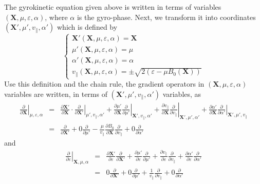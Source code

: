 \documentclass{article}
\begin{document}
The gyrokinetic equation given above is written in terms of variables
$(\mathbf{X}, \mu, \varepsilon, \alpha)$, where $\alpha$ is the gyro-phase.
Next, we transform it into coordinates $(\mathbf{X}', \mu', v_{\parallel},
\alpha')$ which is defined by
\begin{equation}
  \left\{ \begin{array}{l}
    \mathbf{X}' (\mathbf{X}, \mu, \varepsilon, \alpha) =\mathbf{X}\\
    \mu' (\mathbf{X}, \mu, \varepsilon, \alpha) = \mu\\
    \alpha' (\mathbf{X}, \mu, \varepsilon, \alpha) = \alpha\\
    v_{\parallel} (\mathbf{X}, \mu, \varepsilon, \alpha) = \pm \sqrt{2
    (\varepsilon - \mu B_0 (\mathbf{X}))}
  \end{array} \right.
\end{equation}
Use this definition and the chain rule, the gradient operators in
$(\mathbf{X}, \mu, \varepsilon, \alpha)$ variables are written, in terms of
$(\mathbf{X}', \mu', v_{\parallel}, \alpha')$ variables, as
\begin{eqnarray}
  \left. \frac{\partial}{\partial \mathbf{X}} \right|_{\mu, \varepsilon,
  \alpha} & = & \frac{\partial \mathbf{X}'}{\partial \mathbf{X}} \cdot \left.
  \frac{\partial}{\partial \mathbf{X}'} \right|_{\mu', v_{\parallel}, \alpha'}
  + \frac{\partial \mu'}{\partial \mathbf{X}}  \left. \frac{\partial}{\partial
  \mu'} \right|_{\mathbf{X}', v_{\parallel}, \alpha'} + \frac{\partial
  v_{\parallel}}{\partial \mathbf{X}}  \left. \frac{\partial}{\partial
  v_{\parallel}} \right|_{\mathbf{X}', \mu', \alpha'} + \frac{\partial \alpha'
  }{\partial \mathbf{X}}  \left. \frac{\partial}{\partial \alpha'}
  \right|_{\mathbf{X}', \mu', v_{\parallel}} \nonumber\\
  & = & \frac{\partial}{\partial \mathbf{X}'} + 0 \frac{\partial}{\partial
  \mu'} - \frac{\mu}{v_{\parallel}}  \frac{\partial B_0}{\partial \mathbf{X}} 
  \frac{\partial}{\partial v_{\parallel}} + 0 \frac{\partial}{\partial
  \alpha'}  \label{19-1-2-e1}
\end{eqnarray}
and
\begin{eqnarray}
  \left. \frac{\partial}{\partial \varepsilon} \right|_{\mathbf{X}, \mu,
  \alpha} & = & \frac{\partial \mathbf{X}'}{\partial \varepsilon}
  \frac{\partial}{\partial \mathbf{X}'} + \frac{\partial \mu'}{\partial
  \varepsilon} \frac{\partial}{\partial \mu'} + \frac{\partial
  v_{\parallel}}{\partial \varepsilon} \frac{\partial}{\partial v_{\parallel}}
  + \frac{\partial \alpha'}{\partial \varepsilon} \frac{\partial}{\partial
  \alpha'} \nonumber\\
  & = & 0 \frac{\partial}{\partial \mathbf{X}'} + 0 \frac{\partial}{\partial
  \mu'} + \frac{1}{v_{\parallel}}  \frac{\partial}{\partial v_{\parallel}} + 0
  \frac{\partial}{\partial \alpha'} 
\end{eqnarray}
\end{document}
